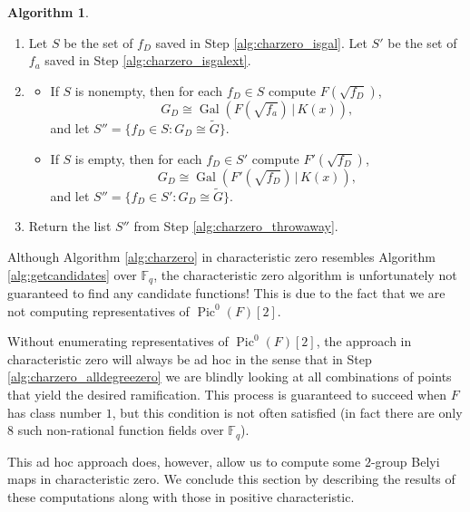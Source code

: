 \documentclass{dcthesis}
\newcommand{\wt}[1]{\widetilde{#1}}
\newcommand{\FF}{\mathbb{F}}
\DeclareMathOperator{\Pic}{Pic}
\DeclareMathOperator{\Gal}{Gal}
\numberwithin{equation}{section}
\theoremstyle{definition}
\newtheorem{alg}[equation]{Algorithm}
\theoremstyle{remark}
\begin{document}
{{{\begin{alg}
\begin{enumerate}
\begin{enumerate}
              then save $f_D$.
              Go to the next $D\in M$.
          \end{enumerate}
        \item\label{alg:charzero_overext}
          Let $S$ be the set of $f_D$
          saved in Step
          \ref{alg:charzero_isgal}.
          Let $S'$ be the set of $f_a$
          saved in Step
          \ref{alg:charzero_isgalext}.
        \item\label{alg:charzero_throwaway}
        \begin{itemize}
          \item
            If $S$ is nonempty,
            then
            for each $f_D\in S$
            compute
            $F(\sqrt{f_D})$,
            \[
              G_D\cong\Gal(F(\sqrt{f_a})\,|\,K(x)),
            \]
            and let
            $S''=
            \{f_D\in S:G_D\cong\wt{G}\}$.
          \item
            If $S$ is empty,
            then
            for each $f_D\in S'$
            compute
            $F'(\sqrt{f_D})$,
            \[
              G_D\cong\Gal(F'(\sqrt{f_D})\,|\,K(x)),
            \]
            and let
            $S''=
            \{f_D\in S':G_D\cong\wt{G}\}$.
        \end{itemize}
        \item\label{alg:charzero_return}
          Return the list $S''$ from
          Step
          \ref{alg:charzero_throwaway}.
      \end{enumerate}
    \end{alg}
    Although Algorithm
    \ref{alg:charzero}
    in characteristic zero
    resembles
    Algorithm
    \ref{alg:getcandidates} over $\FF_q$,
    the characteristic zero algorithm
    is unfortunately not guaranteed to
    find any candidate functions!
    This is due to the fact that
    we are not computing representatives
    of $\Pic^0(F)[2]$.
    \par
    Without enumerating representatives
    of $\Pic^0(F)[2]$,
    the approach in characteristic zero
    will always be ad hoc
    in the sense that in Step
    \ref{alg:charzero_alldegreezero}
    we are blindly looking at all combinations
    of points that yield the desired ramification.
    This process is guaranteed to succeed
    when $F$ has class number $1$,
    but this condition is not often satisfied
    (in fact there are only $8$ such non-rational function fields
    over $\FF_q$).
    \par
    This ad hoc approach does, however,
    allow us to compute some $2$-group
    Belyi maps in characteristic zero.
    We conclude this section by describing
    the results of these computations
    along with those in
    positive characteristic.
  }
}}
\end{document}
